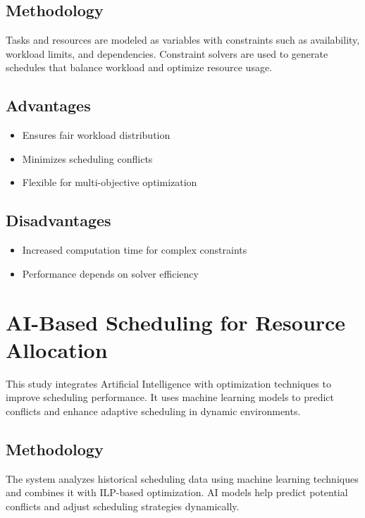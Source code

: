 \documentclass[a4paper, 12pt]{report}
\begin{document}
\subsection{Methodology}
\par Tasks and resources are modeled as variables with constraints such as availability, workload limits, and dependencies. Constraint solvers are used to generate schedules that balance workload and optimize resource usage.

\subsection{Advantages}
\begin{itemize}
    \item Ensures fair workload distribution
    \item Minimizes scheduling conflicts
    \item Flexible for multi-objective optimization
\end{itemize}

\subsection{Disadvantages}
\begin{itemize}
    \item Increased computation time for complex constraints
    \item Performance depends on solver efficiency
\end{itemize}


\section{AI-Based Scheduling for Resource Allocation}
\par This study integrates Artificial Intelligence with optimization techniques to improve scheduling performance. It uses machine learning models to predict conflicts and enhance adaptive scheduling in dynamic environments.

\subsection{Methodology}
\par The system analyzes historical scheduling data using machine learning techniques and combines it with ILP-based optimization. AI models help predict potential conflicts and adjust scheduling strategies dynamically.
\end{document}
